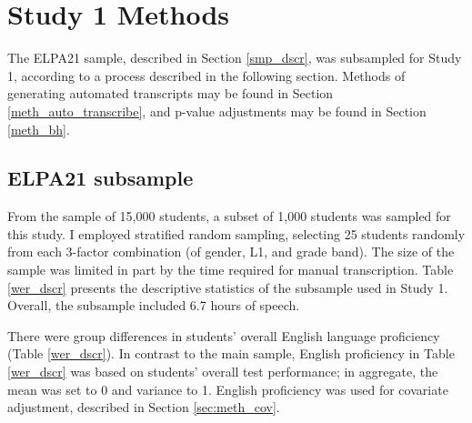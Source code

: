 \documentclass [PhD] {uclathes}
\begin{document}
\section{Study 1 Methods}

The ELPA21 sample, described in Section \ref{smp_dscr}, was subsampled for Study 1, according to a process described in the following section. Methods of generating automated transcripts may be found in Section \ref{meth_auto_transcribe}, and p-value adjustments may be found in Section \ref{meth_bh}. 

\subsection{ELPA21 subsample}

From the sample of 15,000 students, a subset of 1,000 students was sampled for this study. I employed stratified random sampling, selecting 25 students randomly from each 3-factor combination (of gender, L1, and grade band). The size of the sample was limited in part by the time required for manual transcription. Table \ref{wer_dscr} presents the descriptive statistics of the subsample used in Study 1. Overall, the subsample included 6.7 hours of speech. 

There were group differences in students' overall English language proficiency (Table \ref{wer_dscr}). In contrast to the main sample, English proficiency in Table \ref{wer_dscr} was based on students' overall test performance; in aggregate, the mean was set to 0 and variance to 1. English proficiency was used for covariate adjustment, described in Section \ref{sec:meth_cov}.
\end{document}
